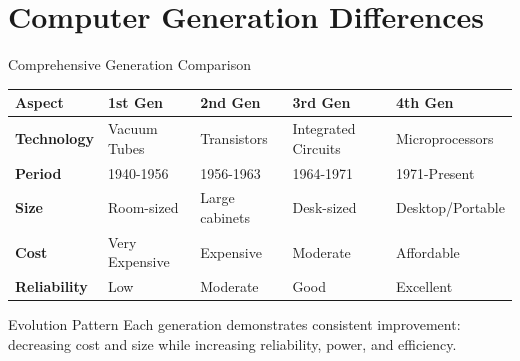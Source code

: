 \documentclass[aspectratio=169]{beamer}
\begin{document}
\section{Computer Generation Differences}

\begin{frame}{Comprehensive Generation Comparison}
    \begin{center}
        \begin{tabular}{|p{2cm}|p{2cm}|p{2cm}|p{2cm}|p{2cm}|}
            \hline
            \textbf{Aspect} & \textbf{1st Gen} & \textbf{2nd Gen} & \textbf{3rd Gen} & \textbf{4th Gen} \\
            \hline
            \textbf{Technology} & Vacuum Tubes & Transistors & Integrated Circuits & Microprocessors \\
            \hline
            \textbf{Period} & 1940-1956 & 1956-1963 & 1964-1971 & 1971-Present \\
            \hline
            \textbf{Size} & Room-sized & Large cabinets & Desk-sized & Desktop/Portable \\
            \hline
            \textbf{Cost} & Very Expensive & Expensive & Moderate & Affordable \\
            \hline
            \textbf{Reliability} & Low & Moderate & Good & Excellent \\
            \hline
        \end{tabular}
    \end{center}
    
    \vspace{0.5cm}
    \begin{exampleblock}{Evolution Pattern}
        Each generation demonstrates consistent improvement: decreasing cost and size while increasing reliability, power, and efficiency.
    \end{exampleblock}
\end{frame}
\end{document}
